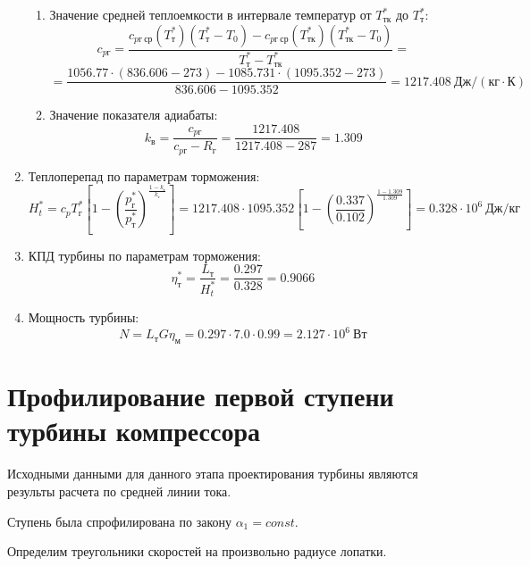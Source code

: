 \documentclass[a4paper,10pt]{article}
\begin{document}
\begin{enumerate}
\begin{enumerate}
	\item Значение средней теплоемкости в интервале температур от $T_{тк}^*$ до $T_{т}^*$:
	\[c_{pг} = \frac{
	c_{pг\ ср}(T_{т}^*) (T_{т}^* - T_0) - c_{pг\ ср}(T_{тк}^*)(T_{тк}^* - T_0)
	}{
	T_{т}^* - T_{тк}^*} = \]
	\[=\frac{
	1056.77 \cdot (836.606 - 273) - 1085.731 \cdot (1095.352 - 273)
	}{
	836.606 - 1095.352} = 1217.408\ Дж / (кг \cdot К)\]
	\item Значение показателя адиабаты:
	\[k_в = \frac{c_{pг}}{c_{pг} - R_г} = \frac{1217.408}{1217.408 - 287} = 1.309\]
	\end{enumerate}

\item Теплоперепад по параметрам торможения:
\[H_t^* = c_p T_г^* \left[
	1 - \left(
	\frac{p_г^*}{p_т^*} \right) ^ {\frac{1 - k_г}{k_г}}
	\right] = 
	1217.408 \cdot 1095.352 \left[
	1 - \left(
	\frac{0.337}{0.102} \right) ^ {\frac{1 - 1.309}{1.309}}
	\right] = 0.328 \cdot 10^6\ Дж/кг\]
\item КПД турбины по параметрам торможения:
\[\eta_т^* = \frac{L_т}{H_t^*} = \frac{0.297}{0.328} = 0.9066\]
\item Мощность турбины:
\[N = L_т G \eta_м = 0.297 \cdot 7.0\cdot 0.99 = 2.127\cdot 10^6\ Вт\]
\end{enumerate}


\section{Профилирование первой ступени турбины компрессора}
Исходными данными для данного этапа проектирования турбины являются результы расчета по средней линии тока.

Ступень была спрофилирована по закону $\alpha_1=const$. 

Определим треугольники скоростей на произвольно радиусе лопатки.
\end{document}
